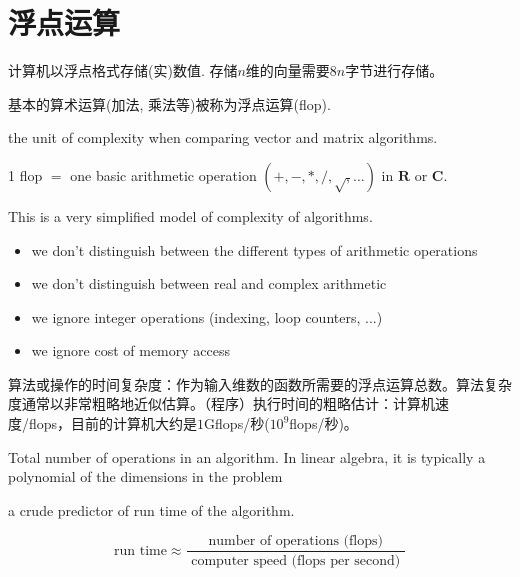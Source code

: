 \section{浮点运算}

计算机以浮点格式存储(实)数值. 存储$n$维的向量需要$8n$字节进行存储。

基本的算术运算(加法, 乘法等)被称为浮点运算(flop). 

\begin{definition}
    the unit of complexity when comparing vector and matrix algorithms.

    1 flop $ = $ one basic arithmetic operation $ (+,-, *, /, \sqrt{,} \ldots) $ in $ \mathbf{R} $ or $ \mathbf{C} $.
\end{definition}

\begin{remark}
    This is a very simplified model of complexity of algorithms.

    \begin{itemize}
        \item we don't distinguish between the different types of arithmetic operations
        \item we don't distinguish between real and complex arithmetic
        \item we ignore integer operations (indexing, loop counters, ...)
        \item we ignore cost of memory access
    \end{itemize}
\end{remark}

算法或操作的时间复杂度：作为输入维数的函数所需要的浮点运算总数。算法复杂度通常以非常粗略地近似估算。（程序）执行时间的粗略估计：计算机速度/flops，目前的计算机大约是$1$Gflops/秒($10^9$flops/秒)。

\begin{definition}
    Total number of operations in an algorithm. In linear algebra, it is typically a polynomial of the dimensions in the problem

\end{definition}
\begin{theorem}[通过浮点运算次数大致预测程序的运行时间]
    a crude predictor of run time of the algorithm.

    $$\text{run time}  \approx \frac{\text { number of operations (flops) }}{\text { computer speed (flops per second) }} $$
\end{theorem}

